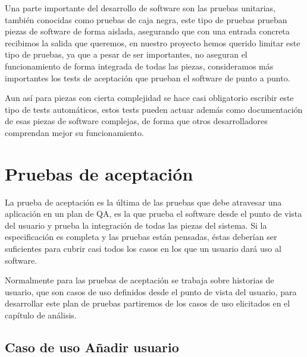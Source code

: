 \documentclass[12pt,a4paperpaper,]{report}
\begin{document}
Una parte importante del desarrollo de software son las pruebas
unitarias, también conocidas como pruebas de caja negra, este tipo de
pruebas prueban piezas de software de forma aislada, asegurando que con
una entrada concreta recibimos la salida que queremos, en nuestro
proyecto hemos querido limitar este tipo de pruebas, ya que a pesar de
ser importantes, no aseguran el funcionamiento de forma integrada de
todas las piezas, consideramos más importantes los tests de aceptación
que prueban el software de punto a punto.

Aun así para piezas con cierta complejidad se hace casi obligatorio
escribir este tipo de tests automáticos, estos tests pueden actuar
además como documentación de esas piezas de software complejas, de forma
que otros desarrolladores comprendan mejor su funcionamiento.

\section{Pruebas de aceptación}\label{pruebas-de-aceptaciuxf3n}

La prueba de aceptación es la última de las pruebas que debe atravesar
una aplicación en un plan de QA, es la que prueba el software desde el
punto de vista del usuario y prueba la integración de todas las piezas
del sistema. Si la especificación es completa y las pruebas están
pensadas, éstas deberían ser suficientes para cubrir casi todos los
casos en los que un usuario dará uso al software.

Normalmente para las pruebas de aceptación se trabaja sobre historias de
usuario, que son casos de uso definidos desde el punto de vista del
usuario, para desarrollar este plan de pruebas partiremos de los casos
de uso elicitados en el capítulo de análisis.

\subsection{Caso de uso Añadir
usuario}\label{caso-de-uso-auxf1adir-usuario-2}
\end{document}
